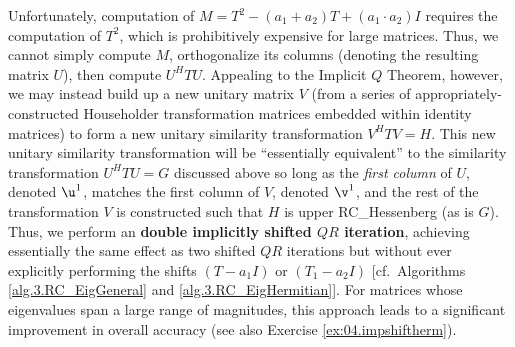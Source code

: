 Unfortunately, computation of $M=T^2 - (a_1+a_2) T + (a_1\cdot a_2) I$ requires the computation of $T^2$, which is prohibitively expensive for large matrices.  Thus, we cannot simply
compute $M$, orthogonalize its columns (denoting the resulting matrix $U$), then compute $U^H T U$.  Appealing to the Implicit $Q$ Theorem, however, we may instead build up a new unitary
matrix $V$ (from a series of appropriately-constructed Householder transformation matrices embedded within identity matrices) to form a new unitary similarity transformation $V^H T V=H$.
This new unitary similarity transformation will be ``essentially equivalent'' to the similarity transformation $U^H T U =G$ discussed above so long as the {\it first column} of $U$, denoted $\u^1$, matches the first column of $V$, denoted $\v^1$,
and the rest of the transformation $V$ is constructed such that $H$ is upper RC_Hessenberg (as is $G$).  Thus, we perform an {\bf double implicitly shifted $QR$ iteration},
achieving essentially the same effect as two shifted $QR$ iterations but without ever explicitly performing the shifts $(T-a_1 I)$ or $(T_1-a_2 I)$ [cf.~Algorithms \ref{alg.3.RC_EigGeneral} and
\ref{alg.3.RC_EigHermitian}].  For matrices whose eigenvalues span a large range of magnitudes, this approach leads to a significant improvement in overall accuracy (see also Exercise
\ref{ex:04.impshiftherm}).

